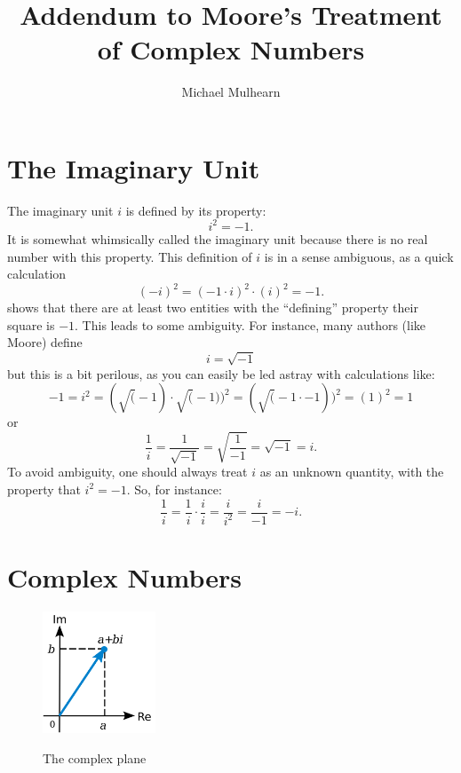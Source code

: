\documentclass[12pt]{article}
\begin{document}
\title{Addendum to Moore's Treatment of Complex Numbers}
\author{Michael Mulhearn}

\maketitle

\section{The Imaginary Unit}

The imaginary unit $i$ is defined by its property:
\begin{equation} \label{eqn:iunit}
i^2 = -1.
\end{equation}
It is somewhat whimsically called the imaginary unit because there is no real number with this property.
This definition of $i$ is in a sense ambiguous, as a quick calculation
\begin{displaymath} 
(-i)^2 = (-1 \cdot i)^2 \cdot (i)^2 = -1.
\end{displaymath}
shows that there are at least two entities with the ``defining''
property their square is $-1$.   This leads to some ambiguity.  For instance, many authors (like Moore) define
\begin{displaymath} 
i = \sqrt{-1}
\end{displaymath} 
but this is a bit perilous, as you can easily be led astray with calculations like:
\begin{displaymath} 
-1 = i^2 = (\sqrt(-1) \cdot \sqrt(-1))^2 = (\sqrt(-1 \cdot -1))^2 = (1)^2 = 1 
\end{displaymath} 
or
\begin{displaymath} 
\frac{1}{i} = \frac{1}{\sqrt{-1}} = \sqrt{\frac{1}{-1}} =  \sqrt{-1} = i.
\end{displaymath}
To avoid ambiguity, one should always treat $i$ as an unknown quantity, with the
property that $i^2=-1$.  So, for instance:
\begin{displaymath} 
\frac{1}{i} = \frac{1}{i} \cdot  \frac{i}{i} = \frac{i}{i^2} = \frac{i}{-1} = -i. 
\end{displaymath}

\section{Complex Numbers}

\begin{figure}[thb]
\begin{center}
{\includegraphics[width=0.30\textwidth]{figs/complex_numbers.png}}
\end{center}
\caption{\label{fig:complexplane} The complex plane}
\end{figure}
\end{document}
